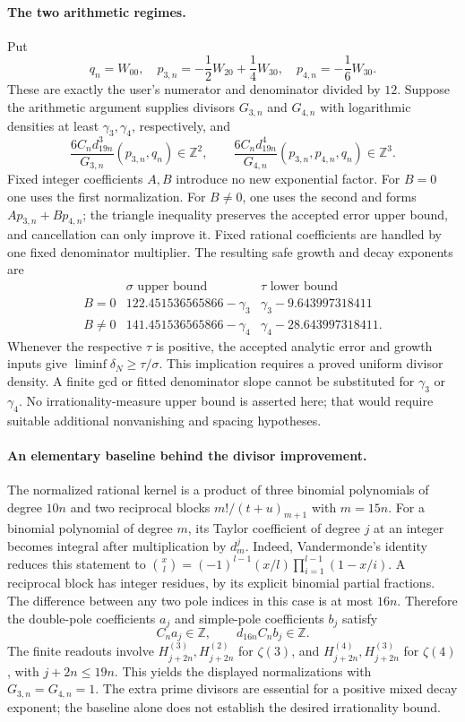 \paragraph{The two arithmetic regimes.}
Put
\[
 q_n=W_{00},\quad
 p_{3,n}=-\frac12W_{20}+\frac14W_{30},\quad
 p_{4,n}=-\frac16W_{30}.
\]
These are exactly the user's numerator and denominator divided by $12$.
Suppose the arithmetic argument supplies divisors $G_{3,n}$ and $G_{4,n}$
with logarithmic densities at least $\gamma_3,\gamma_4$, respectively, and
\[
 \frac{6C_nd_{19n}^3}{G_{3,n}}(p_{3,n},q_n)\in\mathbb Z^2,
 \qquad
 \frac{6C_nd_{19n}^4}{G_{4,n}}(p_{3,n},p_{4,n},q_n)\in\mathbb Z^3.
\]
Fixed integer coefficients $A,B$ introduce no new exponential factor.
For $B=0$ one uses the first normalization. For $B\ne0$, one uses the
second and forms $Ap_{3,n}+Bp_{4,n}$; the triangle inequality preserves
the accepted error upper bound, and cancellation can only improve it.
Fixed rational coefficients are handled by one fixed denominator multiplier.
The resulting safe growth and decay exponents are
\[
\begin{array}{c|cc}
 &\sigma\text{ upper bound}&\tau\text{ lower bound}\\\hline
 B=0&122.451536565866-\gamma_3&\gamma_3-9.643997318411\\
 B\ne0&141.451536565866-\gamma_4&\gamma_4-28.643997318411.
\end{array}
\]
Whenever the respective $\tau$ is positive, the accepted analytic
error and growth inputs give $\liminf\delta_N\ge\tau/\sigma$.
This implication requires a proved uniform divisor density. A finite gcd
or fitted denominator slope cannot be substituted for $\gamma_3$ or
$\gamma_4$. No irrationality-measure upper bound is asserted here; that
would require suitable additional nonvanishing and spacing hypotheses.

\paragraph{An elementary baseline behind the divisor improvement.}
The normalized rational kernel is a product of three binomial polynomials
of degree $10n$ and two reciprocal blocks
$m!/(t+u)_{m+1}$ with $m=15n$.
For a binomial polynomial of degree $m$, its Taylor coefficient of degree
$j$ at an integer becomes integral after multiplication by $d_m^j$.
Indeed, Vandermonde's identity reduces this statement to
$\binom{x}{l}=(-1)^{l-1}(x/l)\prod_{i=1}^{l-1}(1-x/i)$.
A reciprocal block has integer residues, by its explicit binomial
partial fractions. The difference between any two pole indices in this
case is at most $16n$. Therefore the double-pole coefficients $a_j$ and
simple-pole coefficients $b_j$ satisfy
\[
 C_na_j\in\mathbb Z,\qquad d_{16n}C_nb_j\in\mathbb Z.
\]
The finite readouts involve $H_{j+2n}^{(3)},H_{j+2n}^{(2)}$ for $\zeta(3)$,
and $H_{j+2n}^{(4)},H_{j+2n}^{(3)}$ for $\zeta(4)$, with $j+2n\le19n$.
This yields the displayed normalizations with $G_{3,n}=G_{4,n}=1$.
The extra prime divisors are essential for a positive mixed decay exponent;
the baseline alone does not establish the desired irrationality bound.

